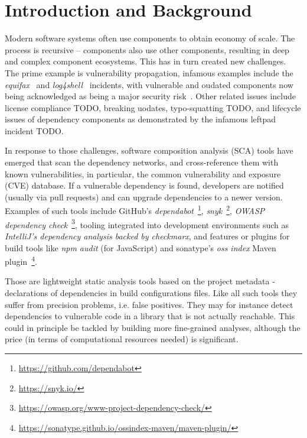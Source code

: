 \section{Introduction and Background}
\label{sec:introduction}


Modern software systems often use components to obtain economy of scale. The process is recursive -- components also use other components, resulting in deep and complex component ecosystems. This has in turn created new challenges. The prime example is vulnerability propagation, infamous examples include the \textit{equifax}~\cite{CVE-2017-5638,luszcz2018apache} and \textit{log4shell}~\cite{CVE-2021-44228,hiesgen2022race} incidents, with vulnerable and oudated components now being acknowledged as being a major security risk~\cite{owaspTop10A06}. Other related issues include license compliance TODO, breaking uodates, typo-squatting TODO, and lifecycle issues of dependency components as demonstrated by the infamous leftpad incident TODO.

In response to those challenges, software composition analysis (SCA)  tools have emerged that scan the dependency networks, and cross-reference them with known vulnerabilities, in particular, the common vulnerability and exposure (CVE) database. If a vulnerable dependency is found, developers are notified (usually via pull requests) and can upgrade dependencies to a newer version.  Examples of such tools include GitHub's \textit{dependabot}~\footnote{\url{https://github.com/dependabot}}, \textit{snyk}~\footnote{\url{https://snyk.io/}},
\textit{OWASP dependency check}~\footnote{\url{https://owasp.org/www-project-dependency-check/}},  tooling integrated into development environments such as \textit{IntelliJ's dependency analysis backed by \textit{checkmarx}},  and features or plugins for build tools like \textit{npm audit} (for JavaScript) and sonatype's \textit{oss index} Maven plugin~\footnote{\url{https://sonatype.github.io/ossindex-maven/maven-plugin/}}.
 
 Those are lightweight static analysis tools based on the project metadata - declarations of dependencies in build configurations files. Like all such tools they suffer from precision problems, i.e. false positives. They may for instance detect dependencies to vulnerable code in a  library that is not actually reachable. This could in principle be tackled by building more fine-grained analyses, although the price (in terms of computational resources needed) is significant. 
 
 
